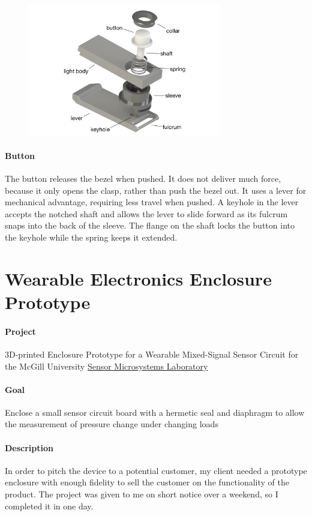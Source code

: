 \documentclass[12pt, landscape]{article}
\begin{document}
		\begin{figure}[H]
			\centering
			\includegraphics[width=0.75\textwidth]{media/button_exploded}
			\label{button_open}
		\end{figure}

	\paragraph{Button}
		The button releases the bezel when pushed. It does not deliver much force, because it only opens the clasp, rather than push the bezel out.  It uses a lever for mechanical advantage, requiring less travel when pushed. A keyhole in the lever accepts the notched shaft and allows the lever to slide forward as its fulcrum snaps into the back of the sleeve.  The flange on the shaft locks the button into the keyhole while the spring keeps it extended.

	

		\clearpage

	\section{Wearable Electronics Enclosure Prototype}
		\paragraph{Project} 3D-printed Enclosure Prototype for a Wearable Mixed-Signal Sensor Circuit for the McGill University \href{http://www.ece.mcgill.ca/~vchoda/Research.htm}{Sensor Microsystems Laboratory}
		\paragraph{Goal} Enclose a small sensor circuit board with a hermetic seal and diaphragm to allow the measurement of pressure change under changing loads
		\paragraph{Description} In order to pitch the device to a potential customer, my client needed a prototype enclosure with enough fidelity to sell the customer on the functionality of the product.  The project was given to me on short notice over a weekend, so I completed it in one day.
\end{document}
